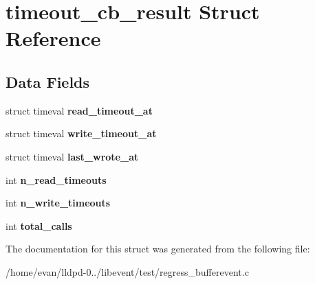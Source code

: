 \section{timeout\-\_\-cb\-\_\-result \-Struct \-Reference}
\label{structtimeout__cb__result}
\subsection*{\-Data \-Fields}
\begin{DoxyCompactItemize}
\item 
struct timeval {\bfseries read\-\_\-timeout\-\_\-at}\label{structtimeout__cb__result_a4a715da2ca8f08ebb289fa447b34e6e6}

\item 
struct timeval {\bfseries write\-\_\-timeout\-\_\-at}\label{structtimeout__cb__result_ab482a124ae879bb6ed615b0e95007393}

\item 
struct timeval {\bfseries last\-\_\-wrote\-\_\-at}\label{structtimeout__cb__result_a41d81484739f0a73c89406bf2b88e094}

\item 
int {\bfseries n\-\_\-read\-\_\-timeouts}\label{structtimeout__cb__result_aaab0df668d80e245dad45c00402a7a41}

\item 
int {\bfseries n\-\_\-write\-\_\-timeouts}\label{structtimeout__cb__result_ad84f613c8b07fc4149b9fff256ec2522}

\item 
int {\bfseries total\-\_\-calls}\label{structtimeout__cb__result_a27a67fa41f808d0fc9c1a59fe48ac156}

\end{DoxyCompactItemize}


\-The documentation for this struct was generated from the following file\-:\begin{DoxyCompactItemize}
\item 
/home/evan/lldpd-\/0../libevent/test/regress\-\_\-bufferevent.\-c\end{DoxyCompactItemize}
